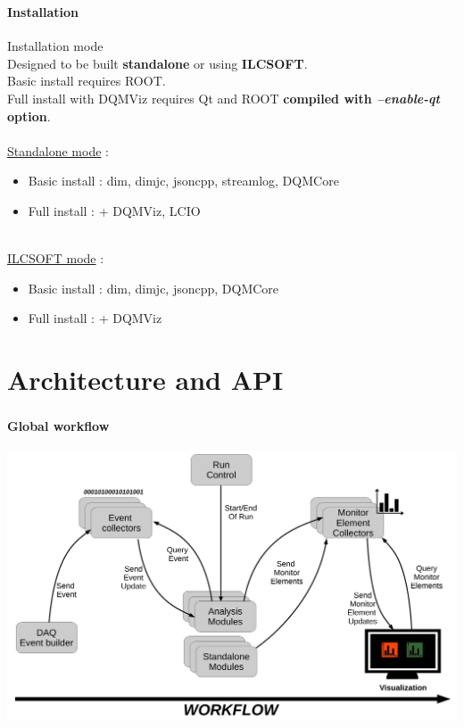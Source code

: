 \documentclass[8pt]{beamer}
\begin{document}
  \begin{frame}
    \frametitle{\secname}
    \framesubtitle{Installation}

    \begin{block}{Installation mode}
      ~ \\
      Designed to be built \textbf{standalone} or using \textbf{ILCSOFT}. \\
      Basic install requires ROOT. \\
      Full install with DQMViz requires Qt and ROOT \textbf{compiled with \textit{--enable-qt} option}. \\
      ~ \\
      \underline{Standalone mode} :
      \begin{itemize}
        \item Basic install : dim, dimjc, jsoncpp, streamlog, DQMCore
        \item Full install : + DQMViz, LCIO
      \end{itemize}
      ~ \\
      \underline{ILCSOFT mode} :
      \begin{itemize}
        \item Basic install : dim, dimjc, jsoncpp, DQMCore
        \item Full install : + DQMViz
      \end{itemize}
    \end{block}
  \end{frame}



  \section{Architecture and API}

  \begin{frame}
    \frametitle{\secname}
    \framesubtitle{Global workflow}

    \begin{center}
      \includegraphics[width=\textwidth]{figs/DQM4HEP_workflow.pdf}
    \end{center}

  \end{frame}
\end{document}
